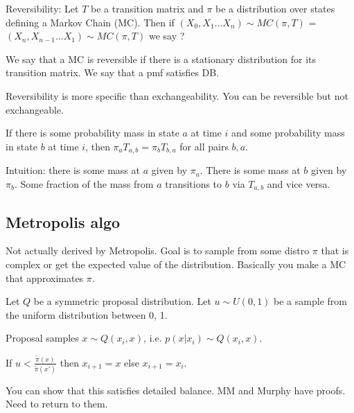 \documentclass[12pt]{amsart}
\begin{document}
Reversibility:  Let $T$ be a transition matrix and $\pi$ be a distribution over states defining a Markov Chain (MC). Then if $(X_0, X_1 ... X_n) \sim MC(\pi, T)$ = $(X_n, X_{n -1} ... X_1) \sim MC(\pi, T)$ we say ? 

We say that a MC is reversible if there is a stationary distribution for its transition matrix. We say that a pmf satisfies DB. 

Reversibility is more specific than exchangeability. You can be reversible but not exchangeable. 

If there is some probability mass in state $a$ at time $i$ and some probability mass in state $b$ at time $i$, then $\pi_a T_{a,b} = \pi_b T_{b,a}$ for all pairs $b,a$.

Intuition: there is some mass at $a$ given by $\pi_a$. There is some mass at $b$ given by $\pi_b$. Some fraction of the mass from $a$ transitions to $b$ via $T_{a,b}$ and vice versa. 

\subsection{Metropolis algo}
Not actually derived by Metropolis. Goal is to sample from some distro $\pi$ that is complex or get the expected value of the distribution. Basically you make a MC that approximates $\pi$. 

Let $Q$ be a symmetric proposal distribution. Let $u \sim U(0,1)$ be a sample from the uniform distribution between 0, 1.

Proposal samples $x \sim Q(x_i, x)$, i.e. $p(x | x_i) \sim Q(x_i, x)$. 

If $u < \frac{\widetilde{\pi}(x)}{\widetilde{\pi}(x')}$ then $x_{i+1} = x$ else $x_{i+ 1} = x_i$.

You can show that this satisfies detailed balance. MM and Murphy have proofs. Need to return to them.
\end{document}
